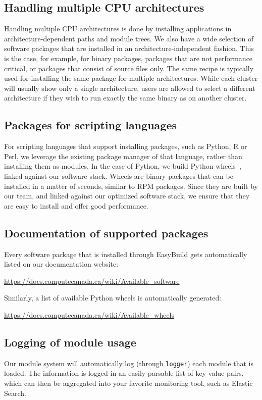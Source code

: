 \documentclass[sigconf]{acmart}
\begin{document}
\subsection{Handling multiple CPU architectures}
\label{sub:Handling_multiple_CPU_architectures}
Handling multiple CPU architectures is done by installing applications in architecture-dependent paths and module trees. We also have a wide selection of software packages that are installed in an architecture-independent fashion. This is the case, for example, for binary packages, packages that are not performance critical, or packages that consist of source files only. The same recipe is typically used for installing the same package for multiple architectures. While each cluster will usually show only a single architecture, users are allowed to select a different architecture if they wish to run exactly the same binary as on another cluster.

\subsection{Packages for scripting languages}
\label{sub:Packages_for_scripting_languages}
For scripting languages that support installing packages, such as Python, R or Perl, we leverage the existing package manager of that language, rather than installing them as modules. In the case of Python, we build Python wheels~\cite{Wheels}, linked against our software stack. Wheels are binary packages that can be installed in a matter of seconds, similar to RPM packages. Since they are built by our team, and linked against our optimized software stack, we ensure that they are easy to install and offer good performance.

\subsection{Documentation of supported packages}
\label{sub:Documentation}
Every software package that is installed through EasyBuild gets automatically listed on our documentation website:
\begin{center}
    \url{https://docs.computecanada.ca/wiki/Available_software}
\end{center}
Similarly, a list of available Python wheels is automatically generated:
\begin{center}
\url{https://docs.computecanada.ca/wiki/Available_wheels}    
\end{center}

\subsection{Logging of module usage}
\label{sub:Logging}
Our module system will automatically log (through \texttt{logger}) each module that is loaded. The information is logged in an easily parsable list of key-value pairs, which can then be aggregated into your favorite monitoring tool, such as Elastic Search. 
\end{document}
